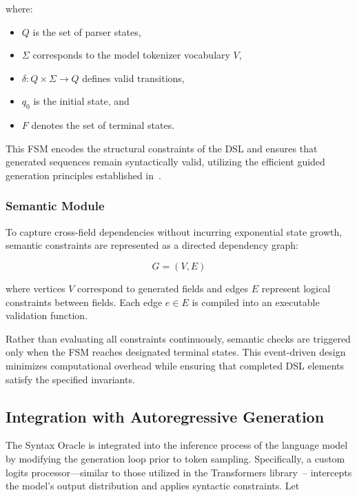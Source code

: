 where:

\begin{itemize}
\item $Q$ is the set of parser states,
\item $\Sigma$ corresponds to the model tokenizer vocabulary $V$,
\item $\delta : Q \times \Sigma \rightarrow Q$ defines valid transitions,
\item $q_0$ is the initial state, and
\item $F$ denotes the set of terminal states.
\end{itemize}

This FSM encodes the structural constraints of the DSL and ensures that 
generated sequences remain syntactically valid, utilizing the efficient guided generation 
principles established in~\cite{willard2023efficient}.

\subsubsection{Semantic Module}
To capture cross-field dependencies without incurring exponential state 
growth, semantic constraints are represented as a directed dependency graph:

\begin{equation}
G = (V, E)
\end{equation}

where vertices $V$ correspond to generated fields and edges $E$ represent 
logical constraints between fields. Each edge $e \in E$ is compiled into 
an executable validation function.

Rather than evaluating all constraints continuously, semantic checks are 
triggered only when the FSM reaches designated terminal states. This 
event-driven design minimizes computational overhead while ensuring that 
completed DSL elements satisfy the specified invariants.

\subsection{Integration with Autoregressive Generation}
The Syntax Oracle is integrated into the inference process of the language 
model by modifying the generation loop prior to token sampling. Specifically, 
a custom logits processor---similar to those utilized in the Transformers library~\cite{wolf2020transformers}--
intercepts the model's output distribution and 
applies syntactic constraints. Let

